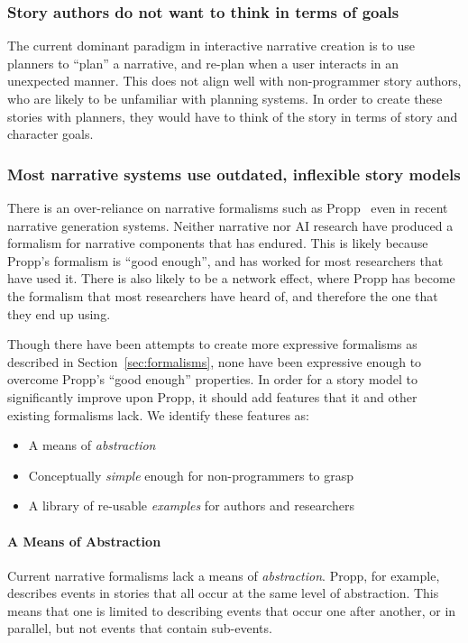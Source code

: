 \documentclass[11pt]{report}
\begin{document}

\subsubsection{Story authors do not want to think in terms of goals}
The current dominant paradigm in interactive narrative creation is to
use planners to ``plan'' a narrative, and re-plan when a user interacts in
an unexpected manner. This does not align well with non-programmer story
authors, who are likely to be unfamiliar with planning systems. In order to
create these stories with planners, they would have to think of the story in
terms of story and character goals.
\subsubsection{Most narrative systems use outdated, inflexible story models}
There is an over-reliance on narrative formalisms such as
Propp~\citep{propp1968morphology} even in recent narrative generation
systems. Neither narrative nor AI research have produced a formalism for
narrative components that has endured. This is likely because Propp's formalism
is ``good enough'', and has worked for most researchers that have used it. There
is also likely to be a network effect, where Propp has become the formalism that
most researchers have heard of, and therefore the one that they end up using.

Though there have been attempts to create more expressive formalisms as
described in Section~\ref{sec:formalisms}, none have been expressive enough to
overcome Propp's ``good enough'' properties. In order for a story model to
significantly improve upon Propp, it should add features that it and other
existing formalisms lack. We identify these features as:

\begin{itemize}
  \item A means of \emph{abstraction}
  \item Conceptually \emph{simple} enough for non-programmers to grasp
  \item A library of re-usable \emph{examples} for authors and researchers
\end{itemize}

\paragraph{A Means of Abstraction}
Current narrative formalisms lack a means of \emph{abstraction}. Propp,
for example, describes events in stories that all occur at the same level of
abstraction. This means that one is limited to describing events that occur one
after another, or in parallel, but not events that contain sub-events.
\end{document}
